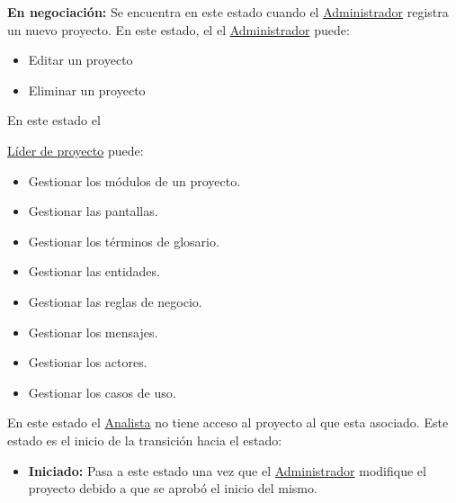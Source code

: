 	\textbf{En negociación:} Se encuentra en este estado cuando el \hyperlink{admin}{Administrador} registra un nuevo proyecto. 
	En este estado, el el \hyperlink{admin}{Administrador} puede:
		\begin{itemize}
			\item Editar un proyecto
			\item Eliminar un proyecto
		\end{itemize}
	En este estado el {\hyperlink{jefe}{Líder de proyecto} puede:
		\begin{itemize}
			\item Gestionar los módulos de un proyecto.
			\item Gestionar las pantallas.
			\item Gestionar los términos de glosario.
			\item Gestionar las entidades.
			\item Gestionar las reglas de negocio.
			\item Gestionar los mensajes.
			\item Gestionar los actores.
			\item Gestionar los casos de uso.
		\end{itemize}
		En este estado el \hyperlink{analista}{Analista} no tiene acceso al proyecto al que esta asociado.
		Este estado es el inicio de la transición hacia el estado:
		\begin{itemize}
			\item \textbf{Iniciado:} Pasa a este estado una vez que el \hyperlink{admin}{Administrador} modifique el proyecto debido a que se aprobó el inicio del mismo.
		\end{itemize}
	
}
